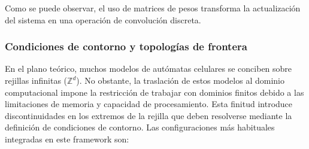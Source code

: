 \documentclass[runningheads]{llncs}
\begin{document}
Como se puede observar, el uso de matrices de pesos transforma la actualización del sistema en una operación de convolución discreta.

\subsubsection{Condiciones de contorno y topologías de frontera}En el plano teórico, muchos modelos de autómatas celulares se conciben sobre rejillas infinitas ($\mathbb{Z}^d$). No obstante, la traslación de estos modelos al dominio computacional impone la restricción de trabajar con dominios finitos debido a las limitaciones de memoria y capacidad de procesamiento. Esta finitud introduce discontinuidades en los extremos de la rejilla que deben resolverse mediante la definición de condiciones de contorno. Las configuraciones más habituales integradas en este framework son:
\end{document}
